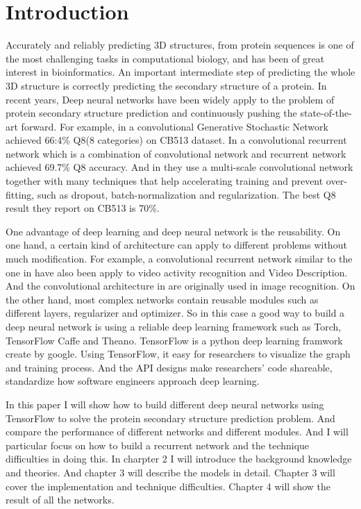 \chapter{Introduction}
	\label{CH_Intro}

Accurately and reliably predicting 3D structures, from protein sequences 
is one of the most challenging tasks in computational biology, and has been of great
interest in bioinformatics. An important intermediate step of predicting the whole 3D structure 
is correctly predicting the secondary structure of a protein\cite{yaseen2014context}. In recent years, 
Deep neural networks have been widely apply to the problem of protein secondary structure prediction and continuously pushing the state-of-the-art forward. For example, in\cite{zhou2014deep} a convolutional Generative Stochastic Network achieved 66:4\% Q8(8 categories) on CB513 dataset.  In \cite{Z.Li2016} a convolutional recurrent network which is a combination of convolutional network and recurrent network achieved 69.7\% Q8 accuracy. And in \cite{busia2016protein} they use a multi-scale convolutional network together with many techniques that help accelerating training and prevent over-fitting, such as dropout\cite{srivastava2014dropout}, batch-normalization\cite{ioffe2015batch} and regularization. The best Q8 result they report on CB513 is 70\%. 

One advantage of deep learning and deep neural network is the reusability. On one hand, a certain kind of architecture can apply to different problems without much modification. For example, a convolutional recurrent network similar to the one in \cite{Z.Li2016} have also been apply to video activity recognition and Video Description\cite{donahue2015long}. And the convolutional architecture in\cite{busia2016protein} are originally used in image recognition. On the other hand, most complex networks contain reusable modules such as different layers, regularizer and optimizer. So in this case a good way to build a deep neural network is using a reliable deep learning framework such as Torch, TensorFlow Caffe and Theano. TensorFlow\cite{abadi2016tensorflow} is a python deep learning framwork create by google. Using TensorFlow, it easy for researchers to visualize the graph and training process. And the API designs make researchers’ code shareable, standardize how software engineers approach deep learning.

In this paper I will show how to build different deep neural networks using TensorFlow to solve the protein secondary structure prediction problem. And compare the performance of different networks and different modules. And I will particular focus on how to build a recurrent network and the technique difficulties in doing this. In charpter 2 I will introduce the background knowledge and theories. And chapter 3 will describe the models in detail. Chapter 3 will cover the implementation and technique difficulties. Chapter 4 will show the result of all the networks.
